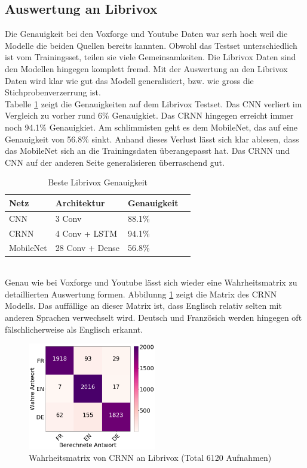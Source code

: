 \subsection{Auswertung an Librivox}
Die Genauigkeit bei den Voxforge und Youtube Daten war serh hoch weil die Modelle die beiden Quellen bereits kannten. Obwohl das Testset unterschiedlich ist vom Trainingsset, teilen sie viele Gemeinsamkeiten. Die Librivox Daten sind den Modellen hingegen komplett fremd. Mit der Auswertung an den Librivox Daten wird klar wie gut das Modell generalisiert, bzw. wie gross die Stichprobenverzerrung ist.
\\
Tabelle \ref{table:test_lib} zeigt die Genauigkeiten auf dem Librivox Testset. Das CNN verliert im Vergleich zu vorher rund 6\% Genauigkiet. Das CRNN hingegen erreicht immer noch 94.1\% Genauigkiet. Am schlimmisten geht es dem MobileNet, das auf eine Genauigkeit von 56.8\% sinkt. Anhand dieses Verlust lässt sich klar ablesen, dass das MobileNet sich an die Trainingsdaten überangepasst hat. Das CRNN und CNN auf der anderen Seite generalisieren überraschend gut.
\begin{table}[h]
	\centering
	\begin{tabular}{llll}
		\hline
		Netz & Architektur     & Genauigkeit  \\ \hline
		CNN  & 3 Conv          & 88.1\%       \\
		CRNN & 4 Conv + LSTM   & 94.1\%       \\
		MobileNet  & 28 Conv + Dense & 56.8\%       \\ \hline
	\end{tabular}
	\caption{Beste Librivox Genauigkeit}
	\label{table:test_lib}
\end{table}
\\
Genau wie bei Voxforge und Youtube lässt sich wieder eine Wahrheitsmatrix zu detaillierten Auswertung formen. Abbilunng \ref{img:matrix_lib} zeigt die Matrix des CRNN Modells. Das auffällige an dieser Matrix ist, dass Englisch relativ selten mit anderen Sprachen verwechselt wird. Deutsch und Französich werden hingegen oft fälschlicherweise als Englisch erkannt. 
\begin{figure}[hbt]
	\centering
		\includegraphics[width=0.5\textwidth]{assets/matrix_lib_crnn.png}
	\caption{Wahrheitsmatrix von CRNN an Librivox (Total 6120 Aufnahmen)}
	\label{img:matrix_lib}
\end{figure}
